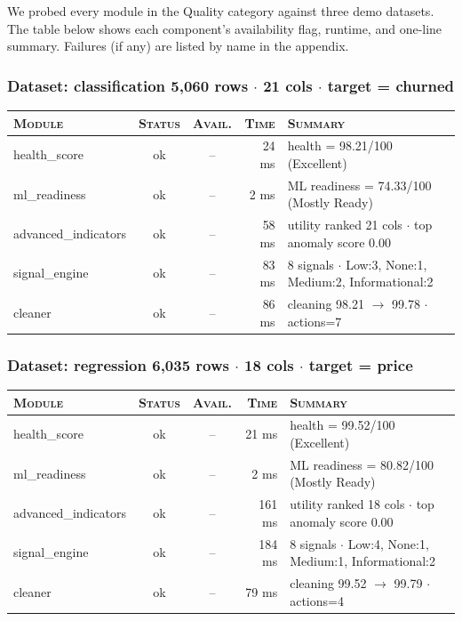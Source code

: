\documentclass[11pt,a4paper]{article}
\begin{document}
We probed every module in the Quality category against three
demo datasets. The table below shows each component's availability flag,
runtime, and one-line summary. Failures (if any) are listed by name in the
appendix.


\subsubsection*{Dataset: classification
\hfill {\color{ink3}\footnotesize 5,060 rows
{$\boldsymbol{\cdot}$} 21 cols
{$\boldsymbol{\cdot}$} target = churned}}

\begin{tabularx}{\linewidth}{l c c r X}
\toprule
\textsc{Module} & \textsc{Status} & \textsc{Avail.} & \textsc{Time} & \textsc{Summary} \\
\midrule
health\_score & \textcolor{ok}{ok} & -- & 24 ms & health = 98.21/100 (Excellent) \\
ml\_readiness & \textcolor{ok}{ok} & -- & 2 ms & ML readiness = 74.33/100 (Mostly Ready) \\
advanced\_indicators & \textcolor{ok}{ok} & -- & 58 ms & utility ranked 21 cols $\cdot$ top anomaly score 0.00 \\
signal\_engine & \textcolor{ok}{ok} & -- & 83 ms & 8 signals $\cdot$ Low:3, None:1, Medium:2, Informational:2 \\
cleaner & \textcolor{ok}{ok} & -- & 86 ms & cleaning 98.21 $\rightarrow$ 99.78 $\cdot$ actions=7 \\
\bottomrule
\end{tabularx}


\subsubsection*{Dataset: regression
\hfill {\color{ink3}\footnotesize 6,035 rows
{$\boldsymbol{\cdot}$} 18 cols
{$\boldsymbol{\cdot}$} target = price}}

\begin{tabularx}{\linewidth}{l c c r X}
\toprule
\textsc{Module} & \textsc{Status} & \textsc{Avail.} & \textsc{Time} & \textsc{Summary} \\
\midrule
health\_score & \textcolor{ok}{ok} & -- & 21 ms & health = 99.52/100 (Excellent) \\
ml\_readiness & \textcolor{ok}{ok} & -- & 2 ms & ML readiness = 80.82/100 (Mostly Ready) \\
advanced\_indicators & \textcolor{ok}{ok} & -- & 161 ms & utility ranked 18 cols $\cdot$ top anomaly score 0.00 \\
signal\_engine & \textcolor{ok}{ok} & -- & 184 ms & 8 signals $\cdot$ Low:4, None:1, Medium:1, Informational:2 \\
cleaner & \textcolor{ok}{ok} & -- & 79 ms & cleaning 99.52 $\rightarrow$ 99.79 $\cdot$ actions=4 \\
\bottomrule
\end{tabularx}
\end{document}
